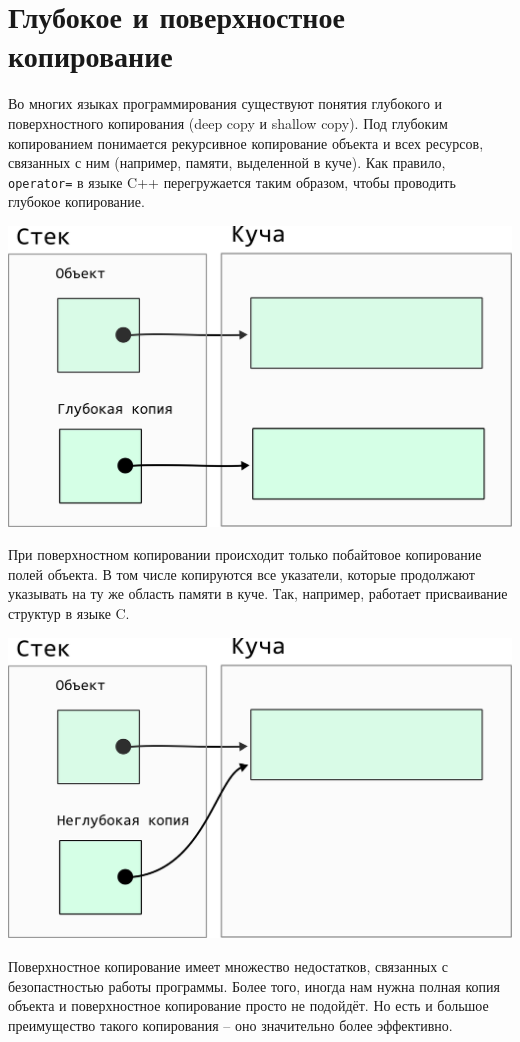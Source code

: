 \documentclass{article}
\begin{document}

\newpage
\section*{Глубокое и поверхностное копирование}
Во многих языках программирования существуют понятия глубокого и поверхностного копирования (deep copy и shallow copy). Под глубоким копированием понимается рекурсивное копирование объекта и всех ресурсов, связанных с ним (например, памяти, выделенной в куче). Как правило, \texttt{operator=} в языке C++ перегружается таким образом, чтобы проводить глубокое копирование.
\begin{center}
\includegraphics[scale=0.9]{../images/deep.png}
\end{center}

При поверхностном копировании происходит только побайтовое копирование полей объекта. В том числе копируются все указатели, которые продолжают указывать на ту же область памяти в куче. Так, например, работает присваивание структур в языке C.

\begin{center}
\includegraphics[scale=0.9]{../images/shallow.png}
\end{center}

Поверхностное копирование имеет множество недостатков, связанных с безопастностью работы программы. Более того, иногда нам нужна полная копия объекта и поверхностное копирование просто не подойдёт. Но есть и большое преимущество такого копирования -- оно значительно более эффективно.
\end{document}
